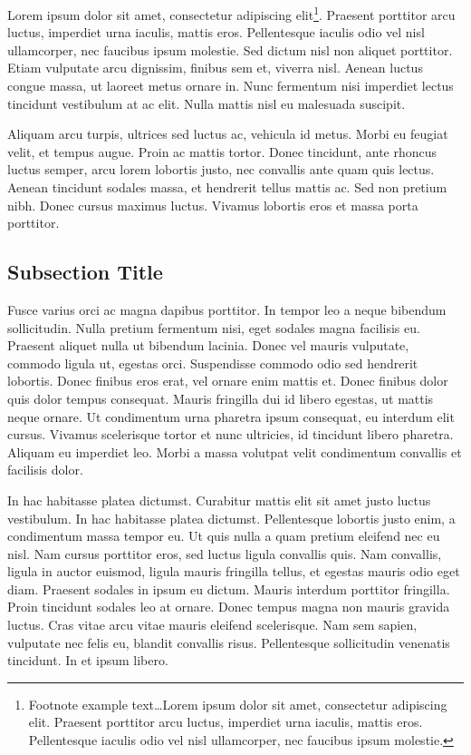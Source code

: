 \documentclass[
	11pt, %
	fleqn, %
	letterpaper, %
]{CommodoreBlueBook}
\begin{document}
Lorem ipsum dolor sit amet, consectetur adipiscing elit\footnote{Footnote example text\ldots Lorem ipsum dolor sit amet, consectetur adipiscing elit. Praesent porttitor arcu luctus, imperdiet urna iaculis, mattis eros. Pellentesque iaculis odio vel nisl ullamcorper, nec faucibus ipsum molestie.}. Praesent porttitor arcu luctus, imperdiet urna iaculis, mattis eros. Pellentesque iaculis odio vel nisl ullamcorper, nec faucibus ipsum molestie. Sed dictum nisl non aliquet porttitor. Etiam vulputate arcu dignissim, finibus sem et, viverra nisl. Aenean luctus congue massa, ut laoreet metus ornare in. Nunc fermentum nisi imperdiet lectus tincidunt vestibulum at ac elit. Nulla mattis nisl eu malesuada suscipit.

Aliquam arcu turpis, ultrices sed luctus ac, vehicula id metus. Morbi eu feugiat velit, et tempus augue. Proin ac mattis tortor. Donec tincidunt, ante rhoncus luctus semper, arcu lorem lobortis justo, nec convallis ante quam quis lectus. Aenean tincidunt sodales massa, et hendrerit tellus mattis ac. Sed non pretium nibh. Donec cursus maximus luctus. Vivamus lobortis eros et massa porta porttitor.

\subsection{Subsection Title}

Fusce varius orci ac magna dapibus porttitor. In tempor leo a neque bibendum sollicitudin. Nulla pretium fermentum nisi, eget sodales magna facilisis eu. Praesent aliquet nulla ut bibendum lacinia. Donec vel mauris vulputate, commodo ligula ut, egestas orci. Suspendisse commodo odio sed hendrerit lobortis. Donec finibus eros erat, vel ornare enim mattis et. Donec finibus dolor quis dolor tempus consequat. Mauris fringilla dui id libero egestas, ut mattis neque ornare. Ut condimentum urna pharetra ipsum consequat, eu interdum elit cursus. Vivamus scelerisque tortor et nunc ultricies, id tincidunt libero pharetra. Aliquam eu imperdiet leo. Morbi a massa volutpat velit condimentum convallis et facilisis dolor.

In hac habitasse platea dictumst. Curabitur mattis elit sit amet justo luctus vestibulum. In hac habitasse platea dictumst. Pellentesque lobortis justo enim, a condimentum massa tempor eu. Ut quis nulla a quam pretium eleifend nec eu nisl. Nam cursus porttitor eros, sed luctus ligula convallis quis. Nam convallis, ligula in auctor euismod, ligula mauris fringilla tellus, et egestas mauris odio eget diam. Praesent sodales in ipsum eu dictum. Mauris interdum porttitor fringilla. Proin tincidunt sodales leo at ornare. Donec tempus magna non mauris gravida luctus. Cras vitae arcu vitae mauris eleifend scelerisque. Nam sem sapien, vulputate nec felis eu, blandit convallis risus. Pellentesque sollicitudin venenatis tincidunt. In et ipsum libero.
\end{document}
